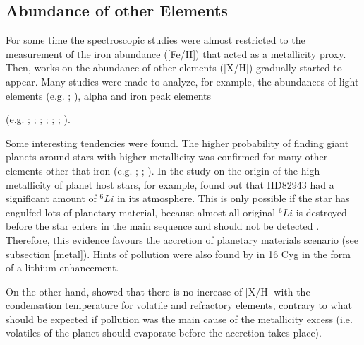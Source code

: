 \documentclass[dvips,12pt,a4paper]{report}
\begin{document}

\subsection {Abundance of other Elements} %
\label {others}

For some time the spectroscopic studies were almost restricted to the measurement of the iron abundance ([Fe/H]) that acted as a metallicity proxy. Then, works on the abundance of other elements ([X/H]) gradually started to appear.
Many studies were made to analyze, for example, the abundances of light elements (e.g. \citeauthor{Sandquist-2002} \citeyear{Sandquist-2002}; \citeauthor{Israelian-2003} \citeyear{Israelian-2003}), alpha and iron peak elements {(e.g.  \citeauthor{Gonzalez-2001} \citeyear{Gonzalez-2001}; \citeauthor{Takeda-2001} \citeyear{Takeda-2001}; \citeauthor{Bodaghee-2003} \citeyear{Bodaghee-2003}; \citeauthor{Ecuvillon-2004b} \citeyear{Ecuvillon-2004b}; \citeauthor{Fischer-2005} \citeyear{Fischer-2005}; \citeauthor{Beirao-2005} \citeyear{Beirao-2005}; \citeauthor{Gilli-2006} \citeyear{Gilli-2006}).

Some interesting tendencies were found. The higher probability of finding giant planets around stars with higher metallicity was confirmed for many other elements other that iron (e.g. \citeauthor{Bodaghee-2003} \citeyear{Bodaghee-2003}; \citeauthor{Beirao-2005} \citeyear{Beirao-2005}; \citeauthor{Gilli-2006} \citeyear{Gilli-2006}). In the study on the origin of the high metallicity of planet host stars, for example, \citet{Israelian-2003} found out that HD82943 had a significant amount of $^6Li$ in its atmosphere. This is only possible if the star has engulfed lots of planetary material, because almost all original $^6Li$ is destroyed before the star enters in the main sequence and should not be detected \citep{Sandquist-2002}. Therefore, this evidence favours the accretion of planetary materials scenario (see subsection \ref{metal}). Hints of pollution were also found by \citet{Laws-2001} in 16 Cyg  in the form of a lithium enhancement.

On the other hand, \citet{Ecuvillon-2006b} showed that there is no increase of [X/H] with the condensation temperature for volatile and refractory elements, contrary to what should be expected if pollution was the main cause of the metallicity excess (i.e. volatiles of the planet should evaporate before the accretion takes place).

}
\end{document}
